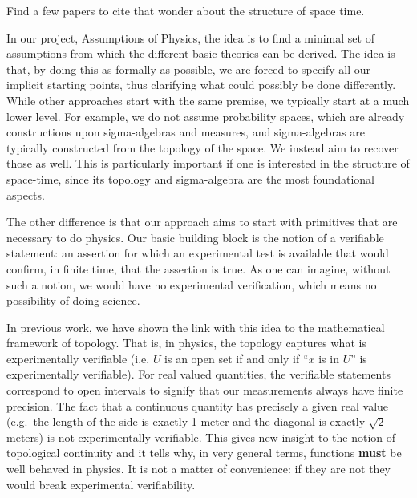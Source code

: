 \documentclass[12pt]{iopart}
\begin{document}
Find a few papers to cite that wonder about the structure of space time.

In our project, Assumptions of Physics, the idea is to find a minimal set of assumptions from which the different basic theories can be derived. The idea is that, by doing this as formally as possible, we are forced to specify all our implicit starting points, thus clarifying what could possibly be done differently. While other approaches start with the same premise, we typically start at a much lower level. For example, we do not assume probability spaces, which are already constructions upon sigma-algebras and measures, and sigma-algebras are typically constructed from the topology of the space. We instead aim to recover those as well. This is particularly important if one is interested in the structure of space-time, since its topology and sigma-algebra are the most foundational aspects.

The other difference is that our approach aims to start with primitives that are necessary to do physics. Our basic building block is the notion of a verifiable statement: an assertion for which an experimental test is available that would confirm, in finite time, that the assertion is true. As one can imagine, without such a notion, we would have no experimental verification, which means no possibility of doing science.

In previous work, we have shown the link with this idea to the mathematical framework of topology. That is, in physics, the topology captures what is experimentally verifiable (i.e. $U$ is an open set if and only if ``$x$ is in $U$'' is experimentally verifiable). For real valued quantities, the verifiable statements correspond to open intervals to signify that our measurements always have finite precision. The fact that a continuous quantity has precisely a given real value (e.g.~the length of the side is exactly 1 meter and the diagonal is exactly $\sqrt{2}$ meters) is not experimentally verifiable. This gives new insight to the notion of topological continuity and it tells why, in very general terms, functions \textbf{must} be well behaved in physics. It is not a matter of convenience: if they are not they would break experimental verifiability.
\end{document}
